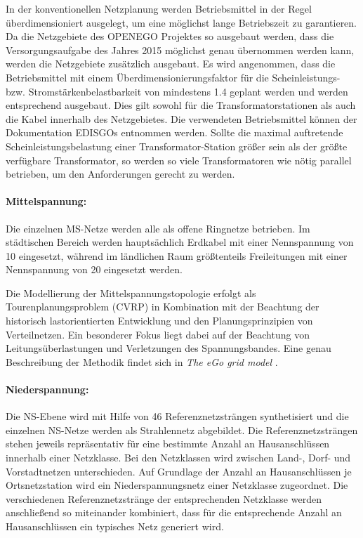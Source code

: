 In der konventionellen Netzplanung werden Betriebsmittel in der Regel überdimensioniert ausgelegt, um eine möglichst lange Betriebszeit zu garantieren.
Da die Netzgebiete des \gls{OPENEGO} Projektes so ausgebaut werden, dass die Versorgungsaufgabe des Jahres \num{2015} möglichst genau übernommen werden kann, werden die Netzgebiete zusätzlich ausgebaut.
Es wird angenommen, dass die Betriebsmittel mit einem Überdimensionierungsfaktor für die Scheinleistungs- bzw. Stromstärkenbelastbarkeit von mindestens \num{1.4} geplant werden und werden entsprechend ausgebaut.
Dies gilt sowohl für die Transformatorstationen als auch die Kabel innerhalb des Netzgebietes.
Die verwendeten Betriebsmittel können der Dokumentation \glspl{EDISGO} \cite{edisgoDocs2017a} entnommen werden.
Sollte die maximal auftretende Scheinleistungsbelastung einer Transformator-Station größer sein als der größte verfügbare Transformator, so werden so viele Transformatoren wie nötig parallel betrieben, um den Anforderungen gerecht zu werden.


\paragraph{Mittelspannung:}

Die einzelnen \gls{MS}-Netze werden alle als offene Ringnetze betrieben.
Im städtischen Bereich werden hauptsächlich Erdkabel mit einer Nennspannung von \SI{10}{\kv} eingesetzt, während im ländlichen Raum größtenteils Freileitungen mit einer Nennspannung von \SI{20}{\kv} eingesetzt werden. \cite{Mueller2019}\medskip

Die Modellierung der Mittelspannungstopologie erfolgt als Tourenplanungsproblem (\gls{CVRP}) in Kombination mit der Beachtung der historisch lastorientierten Entwicklung und den Planungsprinzipien von Verteilnetzen.
Ein besonderer Fokus liegt dabei auf der Beachtung von Leitungsüberlastungen und Verletzungen des Spannungsbandes.
Eine genau Beschreibung der Methodik findet sich in \textit{The eGo grid model} \cite{Amme2018}.


\paragraph{Niederspannung:}

Die \gls{NS}-Ebene wird mit Hilfe von \num{46} Referenznetzsträngen synthetisiert und die einzelnen \gls{NS}-Netze werden als Strahlennetz abgebildet.
Die Referenznetzsträngen stehen jeweils repräsentativ für eine bestimmte Anzahl an Hausanschlüssen innerhalb einer Netzklasse.
Bei den Netzklassen wird zwischen Land-, Dorf- und Vorstadtnetzen unterschieden.
Auf Grundlage der Anzahl an Hausanschlüssen je Ortsnetzstation wird ein Niederspannungsnetz einer Netzklasse zugeordnet.
Die verschiedenen Referenznetzstränge der entsprechenden Netzklasse werden anschließend so miteinander kombiniert, dass für die entsprechende Anzahl an Hausanschlüssen ein typisches Netz generiert wird. \cite{Mueller2019}


